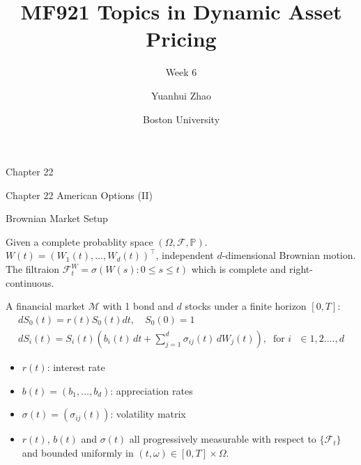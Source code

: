 \documentclass{beamer}
\title{MF921 Topics in Dynamic Asset Pricing}
\subtitle{Week 6}
\author{Yuanhui Zhao}
\date{Boston University}
\begin{document}
\frame{\titlepage}


\begin{frame}{Chapter 22}

    {
    \begin{center}
        Chapter 22 American Options (II)
    \end{center}
    }
    
\end{frame}

\begin{frame}{Brownian Market Setup}

    {\footnotesize \footnotesize
    \par Given a complete probablity space \( (\Omega, \mathcal{F}, \mathbb{P}) \).
    \( W(t) = (W_1(t), \ldots, W_d(t))^\top \), independent \( d \)-dimensional Brownian motion. The filtraion 
    $\mathcal{F}_t^W = \sigma(W(s) : 0 \leq s \leq t)$ which is complete and right-continuous.
    \vspace{1em} 
    \par A financial market $\mathcal{M}$ with 1 bond and $d$ stocks under a finite horizon $[0,T]$:
    \begin{gather*}
    dS_0(t) = r(t)S_0(t)  dt, \quad S_0(0) = 1 \\
    dS_i(t) = S_i(t)\left(b_i(t)\,dt + \sum_{j=1}^d \sigma_{ij}(t)\,dW_j(t)\right),\;\;\text{for $i$ $\in 1,2....,d$}
    \end{gather*}
     \pause 
    \begin{itemize}
        \item \( r(t) \): interest rate
        \item  \( b(t) = (b_1, \ldots, b_d) \): appreciation rates
        \item \( \sigma(t) = (\sigma_{ij}(t)) \): volatility matrix
        \item \( r(t) \), \(b(t) \) and \( \sigma(t)\) all progressively measurable
         with respect to $\{\mathcal{F}_t\}$ and bounded uniformly in $(t,\omega) \in [0,T] \times \Omega$.
    \end{itemize}
    }   
\end{frame}
\end{document}
